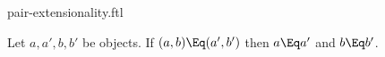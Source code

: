 \documentclass{stex}
\begin{document}
\begin{smodule}{pair-extensionality.ftl}


\begin{forthel}
  \begin{axiom*}
    Let $a,a',b,b'$ be objects.
    If $(a, b) \Eq (a', b')$ then $a \Eq a'$ and $b \Eq b'$.
  \end{axiom*}
\end{forthel}

\end{smodule}
\end{document}

